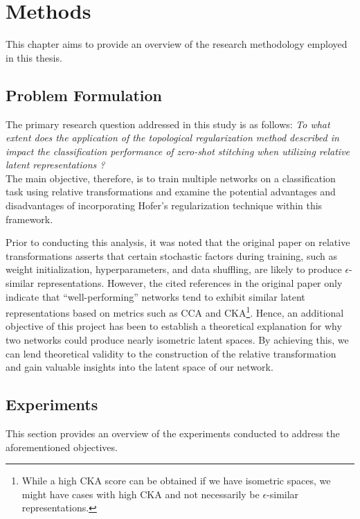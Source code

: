 \documentclass[../main.tex]{subfiles}
\begin{document}
\chapter{Methods}
\label{ch:methods}

This chapter aims to provide an overview of the research methodology employed in this thesis.

\section{Problem Formulation}
The primary research question addressed in this study is as follows: \emph{To what extent does the application of the topological regularization method described in \cite{hofer_densified_2021} impact the classification performance of zero-shot stitching when utilizing relative latent representations \cite{moschella_relative_2022}?}\\

The main objective, therefore, is to train multiple networks on a classification task using relative transformations and examine the potential advantages and disadvantages of incorporating Hofer's regularization technique within this framework.

Prior to conducting this analysis, it was noted that the original paper on relative transformations \cite{moschella_relative_2022} asserts that certain stochastic factors during training, such as weight initialization, hyperparameters, and data shuffling, are likely to produce $\epsilon$-similar representations. However, the cited references in the original paper only indicate that ``well-performing'' networks tend to exhibit similar latent representations based on metrics such as CCA and CKA\footnote{While a high CKA score can be obtained if we have isometric spaces, we might have cases with high CKA and not necessarily be $\epsilon$-similar representations.}. Hence, an additional objective of this project has been to establish a theoretical explanation for why two networks could produce nearly isometric latent spaces. By achieving this, we can lend theoretical validity to the construction of the relative transformation and gain valuable insights into the latent space of our network.

\section{Experiments}
This section provides an overview of the experiments conducted to address the aforementioned objectives.
\end{document}
